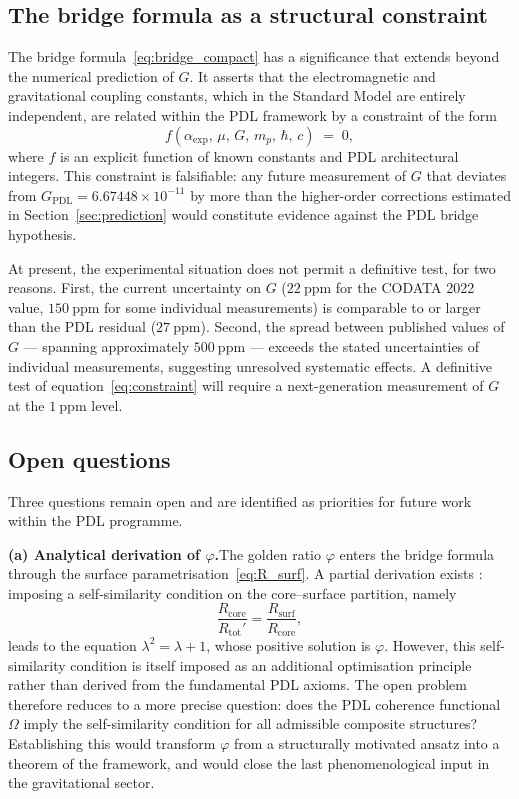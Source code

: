 \documentclass[11pt,a4paper]{article}
\begin{document}
\subsection{The bridge formula as a structural constraint}

The bridge formula~\eqref{eq:bridge_compact} has a significance that extends beyond the numerical prediction of $G$. It asserts that the electromagnetic and gravitational coupling constants, which in the Standard Model are entirely independent, are related within the PDL framework by a constraint of the form
\begin{equation}
    f\!\left(\alpha_{\exp},\,\mu,\,G,\,m_p,\,\hbar,\,c\right) 
    \;=\; 0,
    \label{eq:constraint}
\end{equation}
where $f$ is an explicit function of known constants and PDL architectural integers. This constraint is falsifiable: any future measurement of $G$ that deviates from $G_{\mathrm{PDL}} = 6.67448 \times 10^{-11}$ by more than the higher-order corrections estimated in Section~\ref{sec:prediction} would constitute evidence against the PDL bridge hypothesis.

At present, the experimental situation does not permit a definitive test, for two reasons. First, the current uncertainty on $G$ ($22\ \mathrm{ppm}$ for the CODATA 2022 value, $150\ \mathrm{ppm}$ for some individual measurements) is comparable to or larger than the PDL residual ($27\ \mathrm{ppm}$). Second, the spread between published values of $G$ --- spanning approximately $500\ \mathrm{ppm}$ --- exceeds the stated uncertainties of individual measurements, suggesting unresolved systematic effects. A definitive test of equation~\eqref{eq:constraint} will require a next-generation measurement of $G$ at the $1\ \mathrm{ppm}$ level.

\subsection{Open questions}

Three questions remain open and are identified as priorities for future work within the PDL programme.

\textbf{(a) Analytical derivation of $\varphi$.}The golden ratio $\varphi$ enters the bridge formula through the surface parametrisation~\eqref{eq:R_surf}. A partial derivation exists \cite{Golden_Ratio_PDL_2026}: imposing a self-similarity condition on the core--surface partition, namely
\[
    \frac{R_{\mathrm{core}}}{R_{\mathrm{tot}}'} 
    = \frac{R_{\mathrm{surf}}}{R_{\mathrm{core}}},
\]
leads to the equation $\lambda^2 = \lambda + 1$, whose positive solution is $\varphi$. However, this self-similarity condition is itself imposed as an additional optimisation principle rather than derived from the fundamental PDL axioms. The open problem therefore reduces to a more precise question: does the PDL coherence functional $\Omega$ imply the self-similarity condition for all admissible composite structures? Establishing this would transform $\varphi$ from a structurally motivated ansatz into a theorem of the framework, and would close the last phenomenological input in the gravitational sector.
\end{document}
